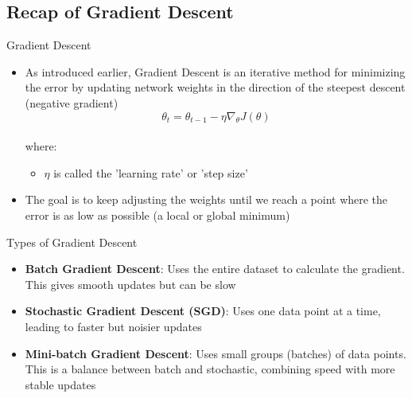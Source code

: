 \documentclass[serif, aspectratio=169]{beamer}
\begin{document}
\subsection{Recap of Gradient Descent}
\begin{frame}{Gradient Descent}
    \begin{itemize}
        \item As introduced earlier, Gradient Descent is an iterative method for minimizing the error by updating network weights in the direction of the steepest descent (negative gradient)
        \[\theta_{t} = \theta_{t-1} - \eta \nabla_{\theta} J(\theta)\]\\
        where:
        \begin{itemize}
            \item $\eta$ is called the 'learning rate' or 'step size'
        \end{itemize}
        \item The goal is to keep adjusting the weights until we reach a point where the error is as low as possible (a local or global minimum)
    \end{itemize}
\end{frame}

\begin{frame}{Types of Gradient Descent}
    \begin{itemize}
        \item \textbf{Batch Gradient Descent}: Uses the entire dataset to calculate the gradient. This gives smooth updates but can be slow
        \item \textbf{Stochastic Gradient Descent (SGD)}: Uses one data point at a time, leading to faster but noisier updates
        \item \textbf{Mini-batch Gradient Descent}: Uses small groups (batches) of data points. This is a balance between batch and stochastic, combining speed with more stable updates
    \end{itemize}
\end{frame}
\end{document}
